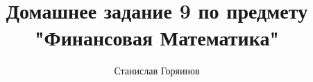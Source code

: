 

\date{}
\title{Домашнее задание 9 по предмету "Финансовая Математика"}
\author{Станислав Горяинов}


\maketitle





